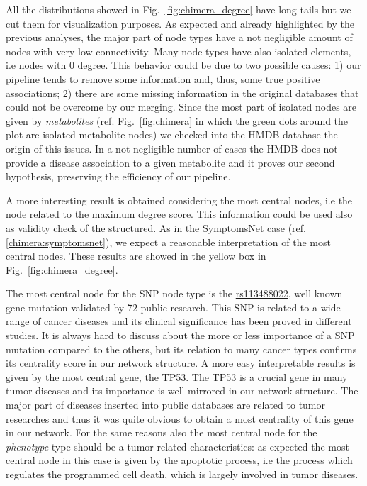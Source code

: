 \documentclass{standalone}
\begin{document}
All the distributions showed in Fig.~\ref{fig:chimera_degree} have long tails but we cut them for visualization purposes.
As expected and already highlighted by the previous analyses, the major part of node types have a not negligible amount of nodes with very low connectivity.
Many node types have also isolated elements, i.e nodes with $0$ degree.
This behavior could be due to two possible causes: 1) our pipeline tends to remove some information and, thus, some true positive associations; 2) there are some missing information in the original databases that could not be overcome by our merging.
Since the most part of isolated nodes are given by \emph{metabolites} (ref. Fig.~\ref{fig:chimera} in which the green dots around the plot are isolated metabolite nodes) we checked into the HMDB database the origin of this issues.
In a not negligible number of cases the HMDB does not provide a disease association to a given metabolite and it proves our second hypothesis, preserving the efficiency of our pipeline.

A more interesting result is obtained considering the most central nodes, i.e the node related to the maximum degree score.
This information could be used also as validity check of the structured.
As in the \textsf{SymptomsNet} case (ref. \ref{chimera:symptomsnet}), we expect a reasonable interpretation of the most central nodes.
These results are showed in the yellow box in Fig.~\ref{fig:chimera_degree}.

The most central node for the SNP node type is the \href{https://www.ncbi.nlm.nih.gov/snp/rs113488022}{\textsf{rs113488022}}, well known gene-mutation validated by 72 public research.
This SNP is related to a wide range of cancer diseases and its clinical significance has been proved in different studies.
It is always hard to discuss about the more or less importance of a SNP mutation compared to the others, but its relation to many cancer types confirms its centrality score in our network structure.
A more easy interpretable results is given by the most central gene, the \href{https://ghr.nlm.nih.gov/gene/TP53}{\textsf{TP53}}.
The \textsf{TP53} is a crucial gene in many tumor diseases and its importance is well mirrored in our network structure.
The major part of diseases inserted into public databases are related to tumor researches and thus it was quite obvious to obtain a most centrality of this gene in our network.
For the same reasons also the most central node for the \emph{phenotype} type should be a tumor related characteristics: as expected the most central node in this case is given by the \textsf{apoptotic process}, i.e the process which regulates the programmed cell death, which is largely involved in tumor diseases.
\end{document}
